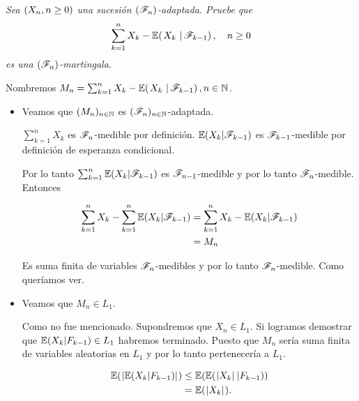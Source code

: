 \emph{
    Sea $\left( X_n,n\geq 0\right) $ una sucesi\'on $\left( \mathscr{F}_n\right) $-adaptada. Pruebe que
    \begin{align}
        \sum_{k=1}^n X_k-\espc{X_k}{\F_{k-1}}, \quad n\geq 0
    \end{align}
    es una $\left( \mathscr{F}_n\right) $-martingala.
}

\afterstatement\par\null

Nombremos $M_n = \sum_{k=1}^n X_k-\espc{X_k}{\F_{k-1}}, n \in \N$.\par\null

\begin{itemize}
	\item 
        Veamos que $(M_n)_{n \in \mathbb{N}}$ es $(\mathscr{F}_n)_{n \in \mathbb{N}}$-adaptada.\par\null
    
        $\sum_{k = 1}^n X_k$ es $\mathscr{F}_n$-medible por definición. $\mathbb{E}(X_k | \mathscr{F}_{k-1})$ es $\mathscr{F}_{k-1}$-medible por definición
        de esperanza condicional. \par\null
        
        Por lo tanto $\sum_{k = 1}^n \mathbb{E}(X_k | \mathscr{F}_{k-1})$ es $\mathscr{F}_{n-1}$-medible y por lo tanto
        $\mathscr{F}_n$-medible. Entonces
        
        \begin{align}
            \sum_{k = 1}^n X_k - \sum_{k = 1}^n \mathbb{E}(X_k | \mathscr{F}_{k-1}) &=  \sum_{k = 1}^n X_k - \mathbb{E}(X_k | \mathscr{F}_{k-1})    \\
                                                                    &=  M_n   
        \end{align}\par\null
    
        Es suma finita de variables $\mathscr{F}_n$-medibles y por lo tanto $\mathscr{F}_n$-medible. Como queríamos ver.\par\null
        
    \item
        Veamos que $M_n \in L_1$.\par\null
        
        Como no fue mencionado. Supondremos que $X_n \in L_1$. Si logramos demostrar que $\mathbb{E}(X_k | F_{k-1}) \in L_1$ habremos terminado.
        Puesto que $M_n$ sería suma finita de variables aleatorias en $L_1$ y por lo tanto pertenecería a $L_1$.\par\null
        
        \begin{align}
            \mathbb{E}(\hspace{.25mm}\left|\mathbb{E}(X_k | F_{k-1})\right|\hspace{.25mm})     &\leq   \mathbb{E}(\mathbb{E}(\hspace{.25mm}\left|X_k\right|\hspace{.25mm} | F_{k-1})) \\
                                            &=      \mathbb{E}(\hspace{.25mm}\left|X_k\right|\hspace{.25mm}). 
        \end{align}
        

\end{itemize}
